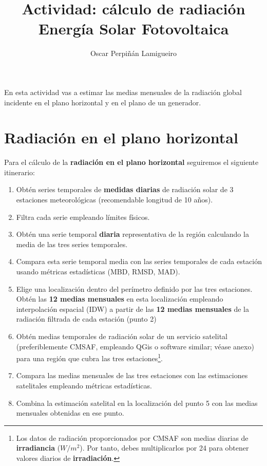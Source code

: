 \documentclass[11pt]{article}
\author{Oscar Perpiñán Lamigueiro}
\date{}
\title{Actividad: cálculo de radiación\\\medskip
\large Energía Solar Fotovoltaica}
\begin{document}
\maketitle

En esta actividad vas a estimar las medias mensuales de la radiación global incidente en el plano horizontal y en el plano de un generador.

\section{Radiación en el plano horizontal}

Para el cálculo de la \textbf{radiación en el plano horizontal} seguiremos el siguiente itinerario:

\begin{enumerate}
\item Obtén series temporales de \textbf{medidas diarias} de radiación solar de 3 estaciones meteorológicas (recomendable longitud de 10 años).
\item Filtra cada serie empleando límites físicos.
\item Obtén una serie temporal \textbf{diaria} representativa de la región calculando la media de las tres series temporales.
\item Compara esta serie temporal media con las series temporales de cada estación usando métricas estadísticas (MBD, RMSD, MAD).
\item Elige una localización dentro del perímetro definido por las tres estaciones. Obtén las \textbf{12 medias mensuales} en esta localización empleando interpolación espacial (IDW) a partir de las \textbf{12 medias mensuales} de la radiación filtrada de cada estación (punto 2)
\item Obtén medias temporales de radiación solar de un servicio satelital (preferiblemente CMSAF,  empleando QGis o software similar; véase anexo) para una región que cubra las tres estaciones\footnote{Los datos de radiación proporcionados por CMSAF son medias diarias de \textbf{irradiancia} (\(W/m^2\)). Por tanto, debes multiplicarlos por 24 para obtener valores diarios de \textbf{irradiación}.}.
\item Compara las medias mensuales de las tres estaciones con las estimaciones satelitales empleando métricas estadísticas.
\item Combina la estimación satelital en la localización del punto 5 con las medias mensuales obtenidas en ese punto.
\end{enumerate}
\end{document}

